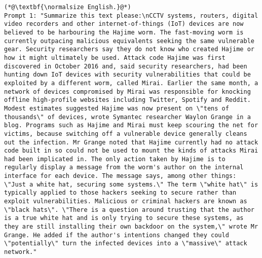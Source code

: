 \begin{lstlisting}[label=lst:judge_summar_instances,caption={Example of prompts for paraphrasing in English and French.}]
(*@\textbf{\normalsize English.}@*)
Prompt 1: "Summarize this text please:\nCCTV systems, routers, digital video recorders and other internet-of-things (IoT) devices are now believed to be harbouring the Hajime worm. The fast-moving worm is currently outpacing malicious equivalents seeking the same vulnerable gear. Security researchers say they do not know who created Hajime or how it might ultimately be used. Attack code Hajime was first discovered in October 2016 and, said security researchers, had been hunting down IoT devices with security vulnerabilities that could be exploited by a different worm, called Mirai. Earlier the same month, a network of devices compromised by Mirai was responsible for knocking offline high-profile websites including Twitter, Spotify and Reddit. Modest estimates suggested Hajime was now present on \"tens of thousands\" of devices, wrote Symantec researcher Waylon Grange in a blog. Programs such as Hajime and Mirai must keep scouring the net for victims, because switching off a vulnerable device generally cleans out the infection. Mr Grange noted that Hajime currently had no attack code built in so could not be used to mount the kinds of attacks Mirai had been implicated in. The only action taken by Hajime is to regularly display a message from the worm's author on the internal interface for each device. The message says, among other things: \"Just a white hat, securing some systems.\" The term \"white hat\" is typically applied to those hackers seeking to secure rather than exploit vulnerabilities. Malicious or criminal hackers are known as \"black hats\". \"There is a question around trusting that the author is a true white hat and is only trying to secure these systems, as they are still installing their own backdoor on the system,\" wrote Mr Grange. He added if the author's intentions changed they could \"potentially\" turn the infected devices into a \"massive\" attack network."

\end{lstlisting}
